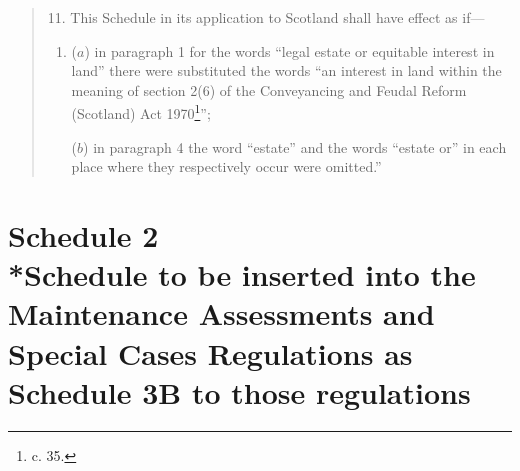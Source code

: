 \documentclass[12pt,a4paper]{article}
\begin{document}
\begin{quotation}
\medskip

11.  This Schedule in its application to Scotland shall have effect as if—
\begin{enumerate}\item[]
($a$) in paragraph 1 for the words “legal estate or equitable interest in land” there were substituted the words “an interest in land within the meaning of section 2(6) of the Conveyancing and Feudal Reform (Scotland) Act 1970\footnote{ c. 35.}”;

($b$) in paragraph 4 the word “estate” and the words “estate or” in each place where they respectively occur were omitted.''
\end{enumerate}
\end{quotation}

\part[Schedule 2 --- Schedule to be inserted into the Maintenance Assessments and Special Cases Regulations as Schedule 3B to those regulations]{Schedule 2\\*Schedule to be inserted into the Maintenance Assessments and Special Cases Regulations as Schedule 3B to those regulations}

\renewcommand\parthead{--- Schedule 2}
\end{document}
